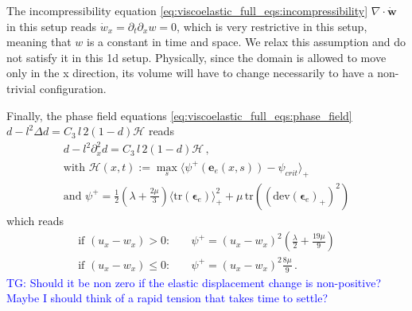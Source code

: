 \documentclass[11pt,a4paper]{article}
\newcommand{\p}{\partial}
\newcommand{\tg}[1]{\textcolor{blue}{TG: #1} }
\newcommand{\bb}[1]{\boldsymbol{#1}}
\newcommand{\dev}{\text{dev}}
\newcommand{\tr}{\text{tr}}
\begin{document}
The incompressibility equation \eqref{eq:viscoelastic_full_eqs:incompressibility} $\nabla \cdot \dot{\bb{w}}$ in this setup reads $\dot{w}_x = \p_t \p_x w =0$, which is very restrictive in this setup, meaning that $w$ is a constant in time and space. We relax this assumption and do not satisfy it in this 1d setup. Physically, since the domain is allowed to move only in the x direction, its volume will have to change necessarily to have a non-trivial configuration.

Finally, the phase field equations \eqref{eq:viscoelastic_full_eqs:phase_field} $d-l^2 \Delta d = C_3 \, l \, 2 \left(1 - d \right) \mathcal{H}$ reads
\begin{align*}
    d - l^2 \p_x^2 d = C_3 \, l \, 2 (1-d) \mathcal{H}
    \,,
    \\
    \text{with } 
    \mathcal{H}(x,t) 
    :=
    \max_s \langle \psi^ + \left( \bb{e}_e (x,s) \right) - \psi_{crit} \rangle_+
    \\
    \text{and }
    \psi^+ = \frac{1}{2} \left(\lambda + \frac{2\mu}{3}\right)
    \langle \tr (\bb{\epsilon}_e) \rangle_+^2
    + \mu \, \tr \left( (\dev(\bb{\epsilon}_e)_+)^2 \right) 
\end{align*}
which reads
\begin{align*}
    \text{if } (u_x-w_x) >0: 
    &
    \quad
    \psi^+ = (u_x-w_x)^2 \left( \frac{\lambda}{2} + \frac{19 \mu}{9} \right)
    \\
    \text{if } (u_x-w_x) \leq 0: 
    &
    \quad
    \psi^+ = (u_x-w_x)^2 \frac{8 \mu}{9}
    \,.
\end{align*}
\tg{Should it be non zero if the elastic displacement change is non-positive? Maybe I should think of a rapid tension that takes time to settle?}
\end{document}
